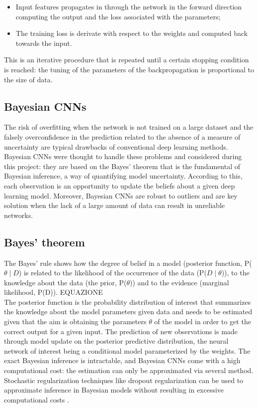 \documentclass[12pt]{article}
\begin{document}
\begin{itemize}
	\item Input features propagates in through the network in the forward direction computing the output and the loss associated with the parameters;
	\item The training loss is derivate with respect to the weights and computed back towards the input.
\end{itemize}
This is an iterative procedure that is repeated until a certain stopping condition is reached: the tuning of the parameters of the backpropagation is proportional to the size of data.
\subsection{Bayesian CNNs}
The risk of overfitting when the network is not trained on a large dataset and the falsely overconfidence in the prediction related to the absence of a measure of uncertainty are typical drawbacks of conventional deep learning methods.
Bayesian CNNs were thought to handle these problems and considered during this project: they are based on the Bayes’ theorem that is the fundamental of Bayesian inference, a way of quantifying model uncertainty. According to this, each observation is an opportunity to update the beliefs about a given deep learning model. Moreover, Bayesian CNNs are robust to outliers and are key solution when the lack of a large amount of data can result in unreliable networks. \cite{1}
\subsection{Bayes' theorem}
The Bayes’ rule shows how the degree of belief in a model (posterior function, P($\theta \mid D$) is related to the likelihood of the occurrence of the data (P($D \mid \theta$)), to the knowledge about the data (the prior, P($\theta$)) and to the evidence (marginal likelihood, P(D)). EQUAZIONE \\
The posterior function is the probability distribution of interest that summarizes the knowledge about the model parameters given data and needs to be estimated given that the aim is obtaining the parameters $\theta$ of the model in order to get the correct output for a given input. The prediction of new observations is made through model update on the posterior predictive distribution, the neural network of interest being a conditional model parameterized by the weights.
The exact Bayesian inference is intractable, and Bayesian CNNs come with a high computational cost: the estimation can only be approximated via several method.\\
Stochastic regularization techniques like dropout regularization can be used to approximate inference in Bayesian models without resulting in excessive computational costs \cite{1}.
\end{document}

